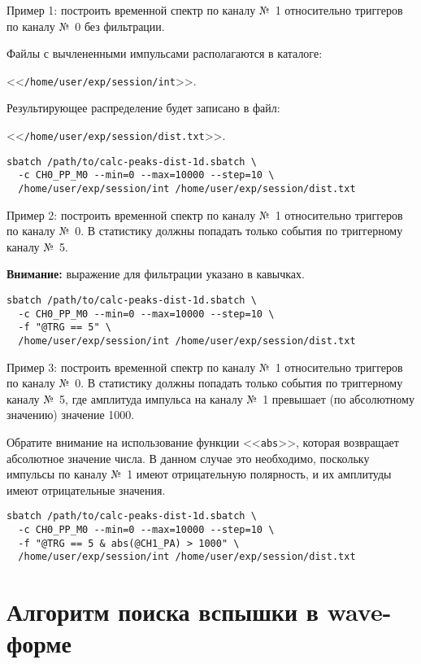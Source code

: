 \documentclass[12pt, a4paper, oneside, onecolumn]{book}
\newcommand{\DIRECTORY}[1]{<<{\tt #1}>>}
\newcommand{\FILE}[1]{<<{\tt #1}>>}
\newcommand{\NOTE}{{\bf Внимание:}}
\begin{document}
Пример 1: построить временной спектр по каналу №~1 относительно триггеров по каналу №~0 без фильтрации. 

Файлы с вычлененными импульсами располагаются в каталоге:

 \DIRECTORY{/home/user/exp/session/int}. 

Результирующее распределение будет записано в файл:

 \FILE{/home/user/exp/session/dist.txt}.

\begin{lstlisting}
sbatch /path/to/calc-peaks-dist-1d.sbatch \
  -c CH0_PP_M0 --min=0 --max=10000 --step=10 \
  /home/user/exp/session/int /home/user/exp/session/dist.txt
\end{lstlisting}

\bigskip
Пример 2: построить временной спектр по каналу №~1 относительно триггеров по каналу №~0. В статистику должны попадать только события по триггерному каналу №~5.

\NOTE{} выражение для фильтрации указано в кавычках.

\begin{lstlisting}
sbatch /path/to/calc-peaks-dist-1d.sbatch \
  -c CH0_PP_M0 --min=0 --max=10000 --step=10 \
  -f "@TRG == 5" \
  /home/user/exp/session/int /home/user/exp/session/dist.txt
\end{lstlisting}

\bigskip
Пример 3: построить временной спектр по каналу №~1 относительно триггеров по каналу №~0. В статистику должны попадать только события по триггерному каналу №~5, где амплитуда импульса на каналу №~1 превышает (по абсолютному значению) значение 1000.

Обратите внимание на использование функции \FILE{abs}, которая возвращает абсолютное значение числа. В данном случае это необходимо, поскольку импульсы по каналу №~1 имеют отрицательную полярность, и их амплитуды имеют отрицательные значения.

\begin{lstlisting}
sbatch /path/to/calc-peaks-dist-1d.sbatch \
  -c CH0_PP_M0 --min=0 --max=10000 --step=10 \
  -f "@TRG == 5 & abs(@CH1_PA) > 1000" \
  /home/user/exp/session/int /home/user/exp/session/dist.txt
\end{lstlisting}


\appendix

\chapter{Алгоритм поиска вспышки в wave-форме}
\end{document}
